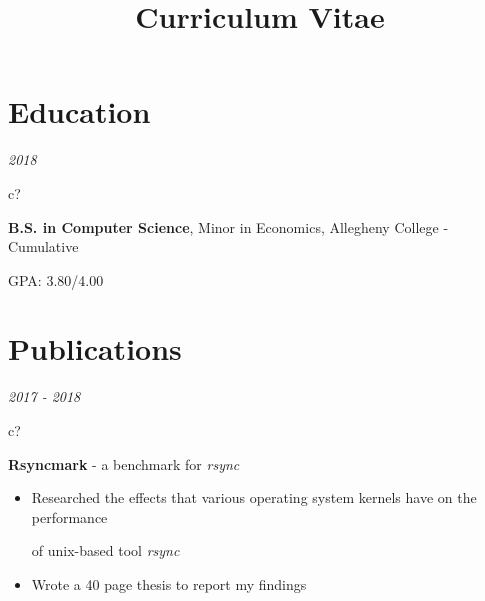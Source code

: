\documentclass[12pt,a4paper,sans]{moderncv} %
\title{Curriculum Vitae}
\begin{document}
\begin{comment}
\hspace{2 mm}
\textit{2018}
\hspace{2 mm}
\begin{tabular}{c?}
 \\
\end{tabular}
 \hspace{2 mm}
 \textbf{B.S. in Computer Science}, minor in Economics, Allegheny College - cumulative GPA: 3.80
\end{comment}

\makecvtitle %
\vspace{-13 mm}
\section{Education}
\hspace{11 mm}
\textit{2018}
\hspace{2 mm}
\begin{tabular}{c?}
 \\
\end{tabular}
 \hspace{2 mm}
 \textbf{B.S. in Computer Science}, Minor in Economics, Allegheny College - Cumulative 
 
 \hspace{31.5 mm}GPA: 3.80/4.00
 
\vspace{-4 mm}
\section{Publications}

\textit{2017 - 2018}
\hspace{2 mm}
\begin{tabular}{c?}
 \\
\end{tabular}
 \hspace{2 mm} \textbf{Rsyncmark} - a benchmark for \textit{rsync} 
 
 \begin{itemize}
 \addtolength{\itemindent}{31.7 mm} 
  \item Researched the effects that various operating system kernels have on the performance 
 
  \hspace{30.5 mm} of  unix-based tool \textit{rsync}
 \item{Wrote a 40 page thesis to report my findings }
 \end{itemize}
 
\end{document}
